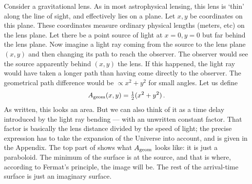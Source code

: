 Consider a gravitational lens.  As in most astrophysical lensing, this
lens is `thin' along the line of sight, and effectively lies on a
plane.  Let $x,y$ be coordinates on this plane.  These coordinates
measure ordinary physical lengths (meters, etc) on the lens plane.
Let there be a point source of light at $x=0,y=0$ but far behind the
lens plane.  Now imagine a light ray coming from the source to the
lens plane $(x,y)$ and then changing its path to reach the observer.
The observer would see the source apparently behind $(x,y)$ the
lens.  If this happened, the light ray would have taken a longer path
than having come directly to the observer.  The geometrical path
difference would be $\propto x^2 + y^2$ for small angles.  Let us
define
\begin{equation} \label{eq:Ageom}
A_{\rm geom}(x,y) = {\textstyle\frac12}(x^2 + y^2) \,.
\end{equation}
As written, this looks an area.  But we can also think of it as a
time delay introduced by the light ray bending --- with an unwritten
constant factor.  That factor is basically the lens distance divided by the
speed of light; the precise expression has to take the expansion of
the Universe into account, and is given in the Appendix.  The top part
of  shows what $A_{\rm geom}$ looks like: it is
just a paraboloid.  The minimum of the surface is at the source, and
that is where, according to Fermat's principle, the image will be.
The rest of the arrival-time surface is just an imaginary surface.

